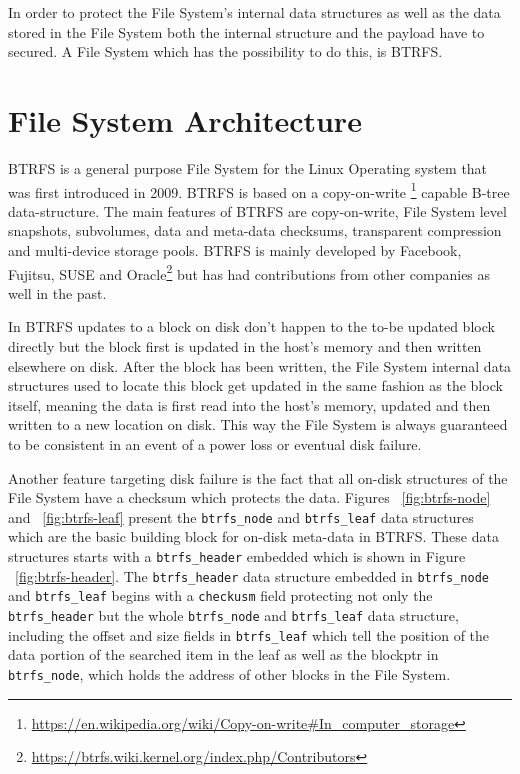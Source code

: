 \documentclass[10pt]{article}
\begin{document}
In order to protect the File System's internal data structures as well as the
data stored in the File System both the internal structure and the payload
have to secured. A File System which has the possibility to do this, is BTRFS.

\section{File System Architecture}
BTRFS\cite{BTRFS} is a general purpose File System for the Linux Operating
system that was first introduced in 2009. BTRFS is based on a copy-on-write
\footnote{\href{https://en.wikipedia.org/wiki/Copy-on-write\#In\_computer\_storage}
{https://en.wikipedia.org/wiki/Copy-on-write\#In\_computer\_storage}} capable
B-tree\cite{rodeh} data-structure. The main features of BTRFS are
copy-on-write, File System level snapshots, subvolumes, data and meta-data
checksums, transparent compression and multi-device storage pools. BTRFS is
mainly developed by Facebook, Fujitsu, SUSE and
Oracle\footnote{\href{https://btrfs.wiki.kernel.org/index.php/Contributors}
{https://btrfs.wiki.kernel.org/index.php/Contributors}} but has had
contributions from other companies as well in the past.

In BTRFS updates to a block on disk don't happen to the to-be updated block
directly but the block first is updated in the host's memory and then written
elsewhere on disk. After the block has been written, the File System internal
data structures used to locate this block get updated in the same fashion as
the block itself, meaning the data is first read into the host's memory,
updated and then written to a new location on disk. This way the File System
is always guaranteed to be consistent in an event of a power loss or eventual
disk failure. 

Another feature targeting disk failure is the fact that all on-disk structures
of the File System have a checksum which protects the data. Figures
~\ref{fig:btrfs-node} and ~\ref{fig:btrfs-leaf} present the
\texttt{btrfs\_node} and \texttt{btrfs\_leaf} data structures which are the
basic building block for on-disk meta-data in BTRFS. These data structures
starts with a \texttt{btrfs\_header} embedded which is shown in Figure
~\ref{fig:btrfs-header}. The \texttt{btrfs\_header} data structure embedded in
\texttt{btrfs\_node} and \texttt{btrfs\_leaf} begins with a \texttt{checkusm}
field protecting not only the \texttt{btrfs\_header} but the whole
\texttt{btrfs\_node} and \texttt{btrfs\_leaf} data structure, including the
offset and size fields in \texttt{btrfs\_leaf} which tell the position of the
data portion of the searched item in the leaf as well as the blockptr in
\texttt{btrfs\_node}, which holds the address of other blocks in the File
System.
\end{document}
